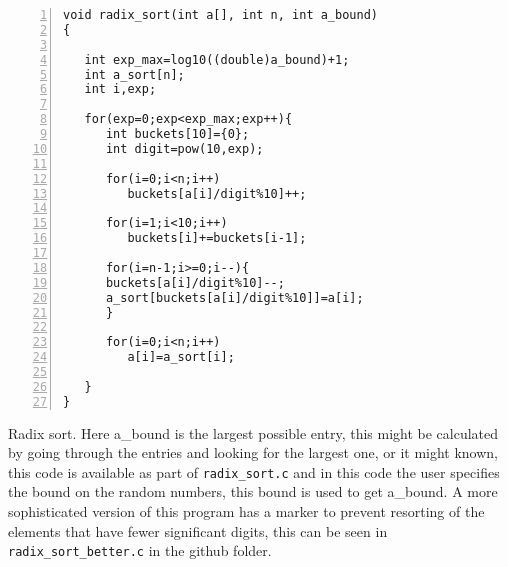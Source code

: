 \documentclass[11pt,a4paper]{scrartcl}
\begin{document}
\begin{table}
\begin{lstlisting}[numbers=left]
void radix_sort(int a[], int n, int a_bound)
{

   int exp_max=log10((double)a_bound)+1;
   int a_sort[n];
   int i,exp;

   for(exp=0;exp<exp_max;exp++){
      int buckets[10]={0};
      int digit=pow(10,exp);

      for(i=0;i<n;i++)
         buckets[a[i]/digit%10]++;

      for(i=1;i<10;i++)
         buckets[i]+=buckets[i-1];

      for(i=n-1;i>=0;i--){
	  buckets[a[i]/digit%10]--;
	  a_sort[buckets[a[i]/digit%10]]=a[i];
      }

      for(i=0;i<n;i++)
         a[i]=a_sort[i];

   }
}
\end{lstlisting}
\caption{Radix sort. Here a\_bound is the largest possible entry, this
  might be calculated by going through the entries and looking for the
  largest one, or it might known, this code is available as part of
  {\tt radix\_sort.c} and in this code the user specifies the bound on
  the random numbers, this bound is used to get a\_bound. A more
  sophisticated version of this program has a marker to prevent
  resorting of the elements that have fewer significant digits, this
  can be seen in {\tt radix\_sort\_better.c} in the github folder.\label{c_radix}}
\end{table}
\end{document}
